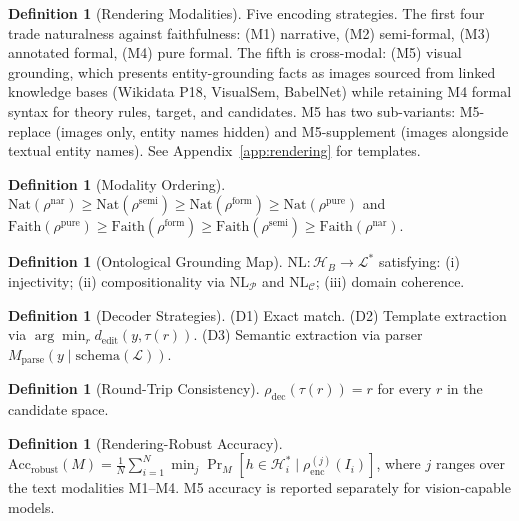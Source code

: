 \documentclass{article}
\theoremstyle{definition}
\newtheorem{definition}[theorem]{Definition}
\newcommand{\HB}{\mathcal{H}_B}
\newcommand{\Hgold}{\mathcal{H}^{*}}
\newcommand{\La}{\mathcal{L}}
\newcommand{\NL}{\mathrm{NL}}
\newcommand{\Nat}{\mathrm{Nat}}
\newcommand{\Faith}{\mathrm{Faith}}
\begin{document}
\begin{definition}[Rendering Modalities]\label{def:modalities}
Five encoding strategies. The first four trade naturalness against faithfulness:
(M1) narrative, (M2) semi-formal, (M3) annotated formal, (M4) pure formal. The fifth is cross-modal: (M5) visual grounding, which presents entity-grounding facts as images sourced from linked knowledge bases (Wikidata P18, VisualSem, BabelNet) while retaining M4 formal syntax for theory rules, target, and candidates. M5 has two sub-variants: M5-replace (images only, entity names hidden) and M5-supplement (images alongside textual entity names). See Appendix~\ref{app:rendering} for templates.
\end{definition}

\begin{definition}[Modality Ordering]\label{def:modorder}
$\Nat(\rho^{\mathrm{nar}}) \geq \Nat(\rho^{\mathrm{semi}}) \geq \Nat(\rho^{\mathrm{form}}) \geq \Nat(\rho^{\mathrm{pure}})$ and $\Faith(\rho^{\mathrm{pure}}) \geq \Faith(\rho^{\mathrm{form}}) \geq \Faith(\rho^{\mathrm{semi}}) \geq \Faith(\rho^{\mathrm{nar}})$.
\end{definition}

\begin{definition}[Ontological Grounding Map]\label{def:nlmap}
$\NL: \HB \to \La^*$ satisfying: (i) injectivity; (ii) compositionality via $\NL_\mathcal{P}$ and $\NL_\mathcal{C}$; (iii) domain coherence.
\end{definition}

\begin{definition}[Decoder Strategies]\label{def:decoder}
(D1) Exact match. (D2) Template extraction via $\arg\min_r d_{\mathrm{edit}}(y, \tau(r))$. (D3) Semantic extraction via parser $M_{\mathrm{parse}}(y \mid \mathrm{schema}(\La))$.
\end{definition}

\begin{definition}[Round-Trip Consistency]\label{def:roundtrip}
$\rho_{\mathrm{dec}}(\tau(r)) = r$ for every $r$ in the candidate space.
\end{definition}

\begin{definition}[Rendering-Robust Accuracy]\label{def:robustacc}
$\mathrm{Acc}_{\mathrm{robust}}(M) = \frac{1}{N} \sum_{i=1}^N \min_{j} \Pr_M[h \in \Hgold_i \mid \rho^{(j)}_{\mathrm{enc}}(I_i)]$, where $j$ ranges over the text modalities M1--M4. M5 accuracy is reported separately for vision-capable models.
\end{definition}
\end{document}
